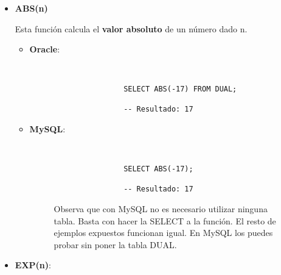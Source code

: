 \begin{itemize}
    \item \textbf{ABS(n)}

    Esta función calcula el \textbf{valor absoluto} de un número dado n.

    \begin{itemize}
        \item \textbf{Oracle}:

        \begin{figure}[h]
            \begin{tcolorbox}[sharp corners, colback=yellow!30, colframe=white!20]
                \scriptsize
                \begin{verbatim}


                SELECT ABS(-17) FROM DUAL;

                -- Resultado: 17
                \end{verbatim}
            \end{tcolorbox}
        \end{figure}

         \item \textbf{MySQL}:

            \begin{figure}[h]
        \begin{tcolorbox}[sharp corners, colback=yellow!30, colframe=white!20]
            \scriptsize
            \begin{verbatim}


                SELECT ABS(-17);

                -- Resultado: 17
            \end{verbatim}
        \end{tcolorbox}
    \end{figure}


    \begin{figure}[H]
        \begin{tcolorbox}[sharp corners, colback=cyan!30, colframe=white!20]
            \normalsize

        Observa que con MySQL no es necesario utilizar ninguna tabla. Basta con hacer la SELECT a la función. El resto de ejemplos expuestos funcionan igual. En MySQL los puedes probar sin poner la tabla DUAL.
        \end{tcolorbox}
    \end{figure}
    \end{itemize}

    \item \textbf{EXP(n)}:


\end{itemize}
